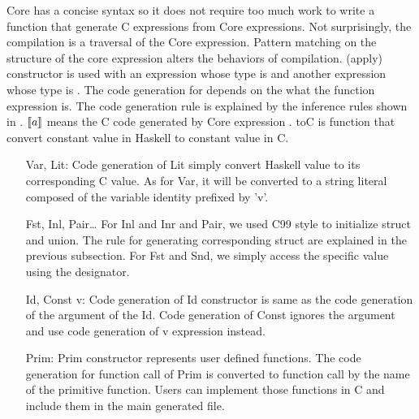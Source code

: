 Core has a concise syntax so it does not require too much work to write a function that generate C expressions from Core expressions. Not surprisingly, the compilation is a traversal of the Core expression. Pattern matching on the structure of the core expression alters the behaviors of compilation.  (apply) constructor is used with an expression whose type is  and another expression whose type is . The code generation for  depends on the what the function expression is. The code generation rule is explained by the inference rules shown in . $\llbracket a \rrbracket$ means the C code generated by Core expression . $\text{toC}$ is function that convert constant value in Haskell to constant value in C. 
\begin{itemize}
    \item[Var, Lit:] Code generation of Lit simply convert Haskell value to its corresponding C value. As for Var, it will be converted to a string literal composed of the variable identity prefixed by 'v'.
    \item[Fst, Inl, Pair\dots] For Inl and Inr and Pair, we used C99 style to initialize struct and union. The rule for generating corresponding struct are explained in the previous subsection. For Fst and Snd, we simply access the specific value using the designator.
    \item[Id, Const v:] Code generation of Id constructor is same as the code generation of the argument of the Id. Code generation of Const ignores the argument and use code generation of v expression instead.
    \item[Prim:] Prim constructor represents user defined functions. The code generation for function call of Prim is converted to function call by the name of the primitive function. Users can implement those functions in C and include them in the main generated file.
\end{itemize}

